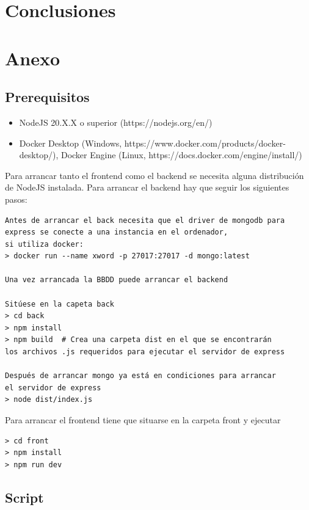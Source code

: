 \documentclass[12pt, a4paper]{article}
\begin{document}
\section{Conclusiones}

\section{Anexo} \label{sec:Anexo}

\subsection{Prerequisitos}

\begin{itemize}
	\item NodeJS 20.X.X o superior (https://nodejs.org/en/)
	\item Docker Desktop (Windows, https://www.docker.com/products/docker-desktop/),
	Docker Engine (Linux, https://docs.docker.com/engine/install/)
\end{itemize}

Para arrancar tanto el frontend como el backend se necesita alguna distribución
de NodeJS instalada. Para arrancar el backend hay que seguir los siguientes pasos:

\begin{verbatim}
Antes de arrancar el back necesita que el driver de mongodb para
express se conecte a una instancia en el ordenador,
si utiliza docker:
> docker run --name xword -p 27017:27017 -d mongo:latest

Una vez arrancada la BBDD puede arrancar el backend
	
Sitúese en la capeta back
> cd back
> npm install
> npm build  # Crea una carpeta dist en el que se encontrarán
los archivos .js requeridos para ejecutar el servidor de express

Después de arrancar mongo ya está en condiciones para arrancar
el servidor de express
> node dist/index.js
\end{verbatim}

Para arrancar el frontend tiene que situarse en la carpeta front y ejecutar

\begin{verbatim}
> cd front
> npm install
> npm run dev
\end{verbatim}

\subsection{Script}
\end{document}
